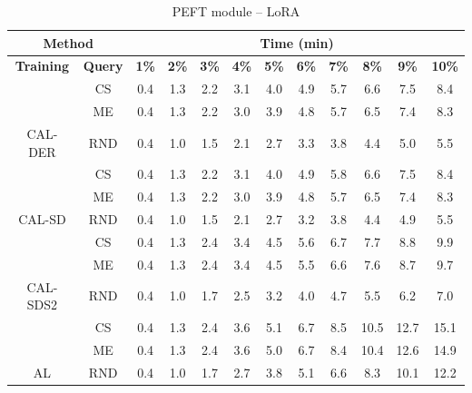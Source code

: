 \begin{table}[htbp]
\centering
\begin{subtable}{\linewidth}
\centering
\caption{PEFT module -- Adapter}

\begin{tabular}{c|c|cccccccccc}
\toprule
\multicolumn{2}{c|}{\textbf{Method}} & \multicolumn{10}{c}{\textbf{Time (min)}} \\
\midrule
\textbf{Training} & \textbf{Query} & \textbf{1\%} & \textbf{2\%} & \textbf{3\%} & \textbf{4\%} & \textbf{5\%} & \textbf{6\%} & \textbf{7\%} & \textbf{8\%} & \textbf{9\%} & \textbf{10\%}\\
\midrule
 & CS & 0.4 & 1.3 & 2.2 & 3.1 & 4.0 & 4.9 & 5.7 & 6.6 & 7.5 & 8.4\\

 & ME & 0.4 & 1.3 & 2.2 & 3.0 & 3.9 & 4.8 & 5.7 & 6.5 & 7.4 & 8.3\\

\multirow{-3}{*}{\raggedright\arraybackslash CAL-DER} & RND & 0.4 & 1.0 & 1.5 & 2.1 & 2.7 & 3.3 & 3.8 & 4.4 & 5.0 & 5.5\\
\midrule
 & CS & 0.4 & 1.3 & 2.2 & 3.1 & 4.0 & 4.9 & 5.8 & 6.6 & 7.5 & 8.4\\

 & ME & 0.4 & 1.3 & 2.2 & 3.0 & 3.9 & 4.8 & 5.7 & 6.5 & 7.4 & 8.3\\

\multirow{-3}{*}{\raggedright\arraybackslash CAL-SD} & RND & 0.4 & 1.0 & 1.5 & 2.1 & 2.7 & 3.2 & 3.8 & 4.4 & 4.9 & 5.5\\
\midrule
 & CS & 0.4 & 1.3 & 2.4 & 3.4 & 4.5 & 5.6 & 6.7 & 7.7 & 8.8 & 9.9\\

 & ME & 0.4 & 1.3 & 2.4 & 3.4 & 4.5 & 5.5 & 6.6 & 7.6 & 8.7 & 9.7\\

\multirow{-3}{*}{\raggedright\arraybackslash CAL-SDS2} & RND & 0.4 & 1.0 & 1.7 & 2.5 & 3.2 & 4.0 & 4.7 & 5.5 & 6.2 & 7.0\\
\midrule
 & CS & 0.4 & 1.3 & 2.4 & 3.6 & 5.1 & 6.7 & 8.5 & 10.5 & 12.7 & 15.1\\

 & ME & 0.4 & 1.3 & 2.4 & 3.6 & 5.0 & 6.7 & 8.4 & 10.4 & 12.6 & 14.9\\

\multirow{-3}{*}{\raggedright\arraybackslash AL} & RND & 0.4 & 1.0 & 1.7 & 2.7 & 3.8 & 5.1 & 6.6 & 8.3 & 10.1 & 12.2\\
\bottomrule
\end{tabular}
\end{subtable}
\vspace{1em}
\begin{subtable}{\linewidth}
\centering
\caption{PEFT module -- LoRA}


\end{subtable}
\end{table}
